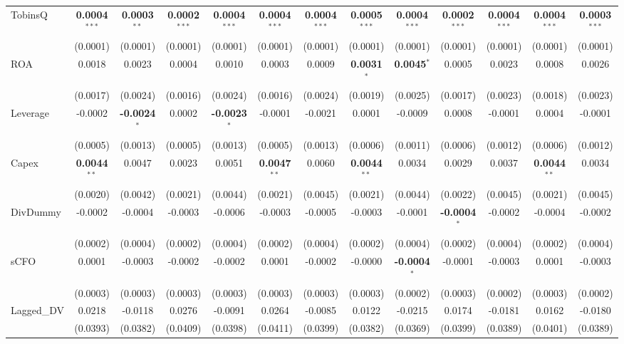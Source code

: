 \begin{landscape}
\begin{table}[H]
\begin{tabular}{lcccccccccccc}
TobinsQ & \textbf{0.0004}$^{***}$ & \textbf{0.0003}$^{**}$ & \textbf{0.0002}$^{***}$ & \textbf{0.0004}$^{***}$ & \textbf{0.0004}$^{***}$ & \textbf{0.0004}$^{***}$ & \textbf{0.0005}$^{***}$ & \textbf{0.0004}$^{***}$ & \textbf{0.0002}$^{***}$ & \textbf{0.0004}$^{***}$ & \textbf{0.0004}$^{***}$ & \textbf{0.0003}$^{***}$ \\
 & (0.0001) & (0.0001) & (0.0001) & (0.0001) & (0.0001) & (0.0001) & (0.0001) & (0.0001) & (0.0001) & (0.0001) & (0.0001) & (0.0001) \\
ROA & 0.0018 & 0.0023 & 0.0004 & 0.0010 & 0.0003 & 0.0009 & \textbf{0.0031}$^{*}$ & \textbf{0.0045}$^{*}$ & 0.0005 & 0.0023 & 0.0008 & 0.0026 \\
 & (0.0017) & (0.0024) & (0.0016) & (0.0024) & (0.0016) & (0.0024) & (0.0019) & (0.0025) & (0.0017) & (0.0023) & (0.0018) & (0.0023) \\
Leverage & -0.0002 & \textbf{-0.0024}$^{*}$ & 0.0002 & \textbf{-0.0023}$^{*}$ & -0.0001 & -0.0021 & 0.0001 & -0.0009 & 0.0008 & -0.0001 & 0.0004 & -0.0001 \\
 & (0.0005) & (0.0013) & (0.0005) & (0.0013) & (0.0005) & (0.0013) & (0.0006) & (0.0011) & (0.0006) & (0.0012) & (0.0006) & (0.0012) \\
Capex & \textbf{0.0044}$^{**}$ & 0.0047 & 0.0023 & 0.0051 & \textbf{0.0047}$^{**}$ & 0.0060 & \textbf{0.0044}$^{**}$ & 0.0034 & 0.0029 & 0.0037 & \textbf{0.0044}$^{**}$ & 0.0034 \\
 & (0.0020) & (0.0042) & (0.0021) & (0.0044) & (0.0021) & (0.0045) & (0.0021) & (0.0044) & (0.0022) & (0.0045) & (0.0021) & (0.0045) \\
DivDummy & -0.0002 & -0.0004 & -0.0003 & -0.0006 & -0.0003 & -0.0005 & -0.0003 & -0.0001 & \textbf{-0.0004}$^{*}$ & -0.0002 & -0.0004 & -0.0002 \\
 & (0.0002) & (0.0004) & (0.0002) & (0.0004) & (0.0002) & (0.0004) & (0.0002) & (0.0004) & (0.0002) & (0.0004) & (0.0002) & (0.0004) \\
sCFO & 0.0001 & -0.0003 & -0.0002 & -0.0002 & 0.0001 & -0.0002 & -0.0000 & \textbf{-0.0004}$^{*}$ & -0.0001 & -0.0003 & 0.0001 & -0.0003 \\
 & (0.0003) & (0.0003) & (0.0003) & (0.0003) & (0.0003) & (0.0003) & (0.0003) & (0.0002) & (0.0003) & (0.0002) & (0.0003) & (0.0002) \\
Lagged\_DV & 0.0218 & -0.0118 & 0.0276 & -0.0091 & 0.0264 & -0.0085 & 0.0122 & -0.0215 & 0.0174 & -0.0181 & 0.0162 & -0.0180 \\
 & (0.0393) & (0.0382) & (0.0409) & (0.0398) & (0.0411) & (0.0399) & (0.0382) & (0.0369) & (0.0399) & (0.0389) & (0.0401) & (0.0389) \\

\end{tabular}
\end{table}
\end{landscape}
